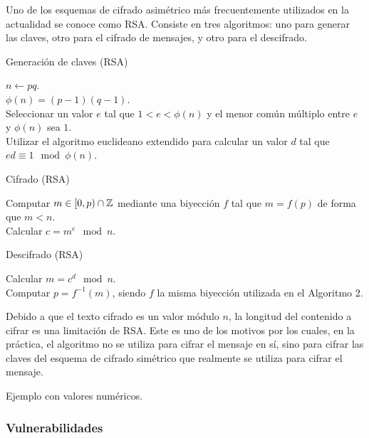 Uno de los esquemas de cifrado asimétrico más frecuentemente utilizados en la actualidad se conoce como RSA. Consiste en tres algoritmos: uno para generar las claves, otro para el cifrado de mensajes, y otro para el descifrado.

\begin{algorithm}
	\caption{Generación de claves (RSA)}\label{alg:1}
	$n \gets pq$.\\
	$\phi(n) = (p - 1)(q - 1)$.\\
	Seleccionar un valor $e$ tal que $1 < e < \phi(n)$ y el menor común múltiplo entre $e$ y $\phi(n)$ sea $1$.\\
	Utilizar el algoritmo euclideano extendido para calcular un valor $d$ tal que $ed \equiv 1 \mod \phi(n)$.
\end{algorithm}

\begin{algorithm}
	\caption{Cifrado (RSA)}\label{alg:2}
	Computar $m \in [0, p) \cap \mathbb{Z}$ mediante una biyección $f$ tal que $m = f(p)$ de forma que $m < n$.\\
	Calcular $c = m^e \mod n$.
\end{algorithm}

\begin{algorithm}
	\caption{Descifrado (RSA)}\label{alg:3}
	Calcular $m = c^d \mod n$.\\
	Computar $p = f^{-1}(m)$, siendo $f$ la misma biyección utilizada en el Algoritmo 2.
\end{algorithm}

\newpage

Debido a que el texto cifrado es un valor módulo $n$, la longitud del contenido a cifrar es una limitación de RSA. Este es uno de los motivos por los cuales, en la práctica, el algoritmo no se utiliza para cifrar el mensaje en sí, sino para cifrar las claves del esquema de cifrado simétrico que realmente se utiliza para cifrar el mensaje.

\begin{example}
	Ejemplo con valores numéricos.
\end{example}

\subsubsection{Vulnerabilidades}

